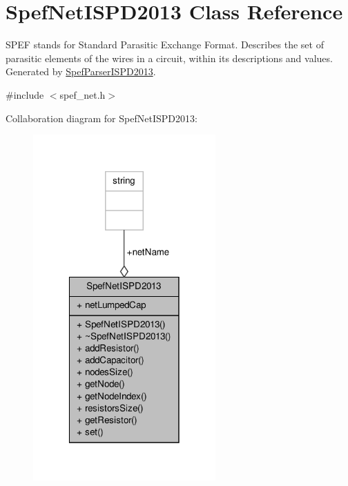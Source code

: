 \hypertarget{classSpefNetISPD2013}{\section{Spef\-Net\-I\-S\-P\-D2013 Class Reference}
\label{classSpefNetISPD2013}
}


S\-P\-E\-F stands for Standard Parasitic Exchange Format. Describes the set of parasitic elements of the wires in a circuit, within its descriptions and values. Generated by \hyperlink{classSpefParserISPD2013}{Spef\-Parser\-I\-S\-P\-D2013}.  




{\ttfamily \#include $<$spef\-\_\-net.\-h$>$}



Collaboration diagram for Spef\-Net\-I\-S\-P\-D2013\-:\nopagebreak
\begin{figure}[H]
\begin{center}
\leavevmode
\includegraphics[width=198pt]{classSpefNetISPD2013__coll__graph}
\end{center}
\end{figure}
